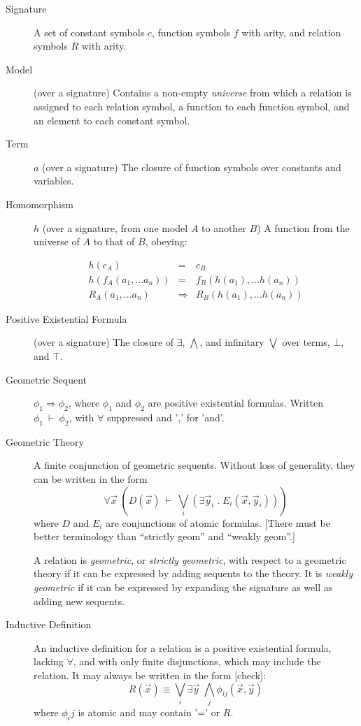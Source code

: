 \documentclass[12pt]{article}
\newcommand{\OR}{\bigvee}
\newcommand{\AND}{\bigwedge}
\newcommand{\imp}{\Rightarrow}
\newcommand{\seq}[2]{#1 \ \vdash\  #2}
\begin{document}
\begin{description}

\item[Signature] A set of constant symbols $c$, function symbols $f$
with arity, and relation symbols $R$ with arity.

\item[Model] (over a signature) Contains a non-empty \emph{universe}
from which a relation is assigned to each relation symbol, a function
to each function symbol, and an element to each constant symbol.

\item[Term] $a$ (over a signature) The closure of function symbols over
constants and variables.

\item[Homomorphism] $h$ (over a signature, from one model $A$ to another
$B$) A function from the universe of $A$ to that of $B$, obeying:

\begin{eqnarray*}
h(c_A) &=& c_B \\
h(f_A(a_1, ... a_n)) &=& f_B(h(a_1), ... h(a_n)) \\
R_A(a_1, ... a_n) &\imp& R_B(h(a_1), ... h(a_n))
\end{eqnarray*}

\item[Positive Existential Formula] (over a signature) The closure of
$\exists$, $\bigwedge$, and infinitary $\bigvee$ over terms, $\bot$,
and $\top$.

\item[Geometric Sequent] $\phi_1 \imp \phi_2$, where $\phi_1$ and
$\phi_2$ are positive existential formulas.  Written
$\seq{\phi_1}{\phi_2}$, with $\forall$ suppressed and ',' for 'and'.

\item[Geometric Theory] A finite conjunction of geometric sequents. Without
loss of generality, they can be written in the form
$$ \forall \vec{x}\; (\seq{D(\vec{x})}
{\OR_i(\exists \vec{y}_i\; .\; E_i(\vec{x}, \vec{y}_i))}) $$
where $D$ and $E_i$ are conjunctions of atomic formulas. [There must
be better terminology than ``strictly geom'' and ``weakly geom''.]

A relation is \emph{geometric}, or \emph{strictly geometric}, with
respect to a geometric theory if it can be expressed by adding
sequents to the theory.  It is \emph{weakly geometric} if it can be
expressed by expanding the signature as well as adding new sequents.

\item[Inductive Definition] An inductive definition for a relation is
a positive existential formula, lacking $\forall$, and with only
finite disjunctions, which may include the relation. It may always be
written in the form [check]:
$$ R(\vec{x}) \equiv \OR_i \exists
\vec{y}\; \AND_j \phi_{ij}(\vec{x}, \vec{y}) $$
where $\phi_ij$ is atomic and may contain '=' or $R$.

\end{description}
\end{document}
